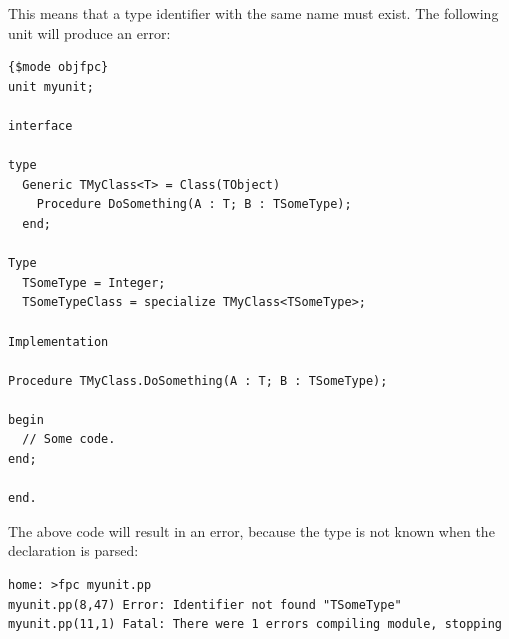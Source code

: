 This means that a type identifier with the same name must exist.
The following unit will produce an error:
\begin{verbatim}
{$mode objfpc}
unit myunit;

interface

type
  Generic TMyClass<T> = Class(TObject)
    Procedure DoSomething(A : T; B : TSomeType);
  end;

Type
  TSomeType = Integer;
  TSomeTypeClass = specialize TMyClass<TSomeType>;

Implementation

Procedure TMyClass.DoSomething(A : T; B : TSomeType);

begin
  // Some code.
end;

end.
\end{verbatim}
The above code will result in an error, because the type  is
not known when the declaration is parsed:
\begin{verbatim}
home: >fpc myunit.pp
myunit.pp(8,47) Error: Identifier not found "TSomeType"
myunit.pp(11,1) Fatal: There were 1 errors compiling module, stopping
\end{verbatim}

